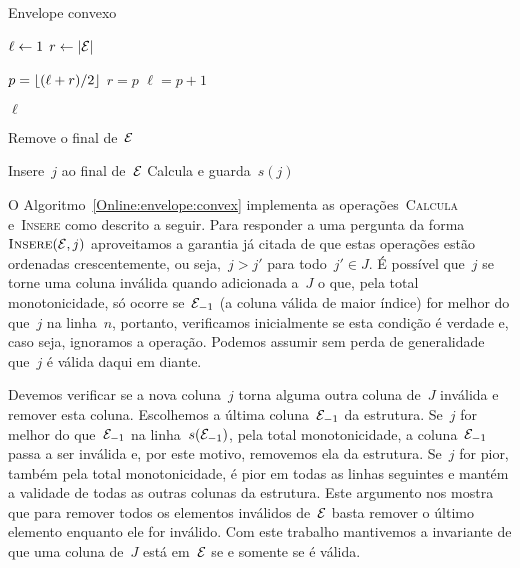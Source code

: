\begin{algorithm}[h]
\caption{Envelope convexo}
\label{Online:envelope:convex}
\begin{algorithmic}[1]
    \State $\ell \leftarrow 1$
    \State $r \leftarrow |\mathcal{E}|$
    
        \State $p = \lfloor (\ell+r)/2 \rfloor$
            \State $r = p$
        \Else
            \State $\ell = p+1$
        \EndIf
    \EndWhile

    \State \Return $\ell$
\EndFunction

        \State \Return
    \EndIf
    
        \State Remove o final de~$\mathcal{E}$
    \EndWhile

    \State Insere~$j$ ao final de~$\mathcal{E}$
    \State Calcula e guarda~$s(j)$
\EndFunction
\end{algorithmic}
\end{algorithm}

O Algoritmo~\ref{Online:envelope:convex} implementa as operações~\textsc{Calcula} e~\textsc{Insere} como descrito a seguir. Para responder a uma pergunta da forma~$\textsc{Insere}(\mathcal{E},j)$ aproveitamos a garantia já citada de que estas operações estão ordenadas crescentemente, ou seja,~$j > j'$ para todo~$j' \in J$. É possível que~$j$ se torne uma coluna inválida quando adicionada a~$J$ o que, pela total monotonicidade, só ocorre se~$\mathcal{E}_{-1}$ (a coluna válida de maior índice) for melhor do que~$j$ na linha~$n$, portanto, verificamos inicialmente se esta condição é verdade e, caso seja, ignoramos a operação. Podemos assumir sem perda de generalidade que~$j$ é válida daqui em diante.

Devemos verificar se a nova coluna~$j$ torna alguma outra coluna de~$J$ inválida e remover esta coluna. Escolhemos a última coluna~$\mathcal{E}_{-1}$ da estrutura. Se~$j$ for melhor do que~$\mathcal{E}_{-1}$ na linha~$s(\mathcal{E}_{-1})$, pela total monotonicidade, a coluna~$\mathcal{E}_{-1}$ passa a ser inválida e, por este motivo, removemos ela da estrutura. Se~$j$ for pior, também pela total monotonicidade, é pior em todas as linhas seguintes e mantém a validade de todas as outras colunas da estrutura. Este argumento nos mostra que para remover todos os elementos inválidos de~$\mathcal{E}$ basta remover o último elemento enquanto ele for inválido. Com este trabalho mantivemos a invariante de que uma coluna de~$J$ está em~$\mathcal{E}$ se e somente se é válida.

